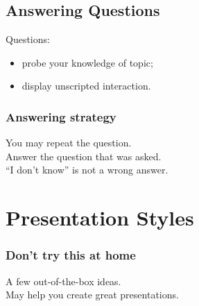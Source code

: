 \documentclass{beamer}
\begin{document}
\subsection{Answering Questions}

\begin{frame}

\Large
Questions:

\begin{itemize}
\item probe your knowledge of topic;
\item display unscripted interaction.
\end{itemize}

\end{frame}

\begin{frame}

\frametitle{Answering strategy}

\Large
You may repeat the question.\\[1em]

Answer the question that was asked.\\[1em]

``I don't know'' is not a wrong answer.\\[1em]

\end{frame}

\section{Presentation Styles}

\begin{frame}
\frametitle{Don't try this at home}

\Large
A few out-of-the-box ideas.\\[1em]

May help you create great presentations.

\end{frame}
\end{document}
